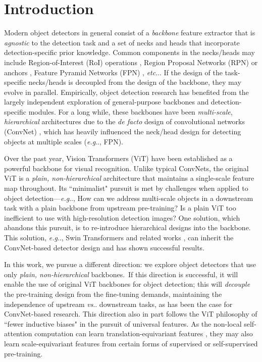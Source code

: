 \documentclass[runningheads]{llncs}
\makeatletter
\DeclareRobustCommand\onedot{\futurelet\@let@token\@onedot}
\def\@onedot{\ifx\@let@token.\else.\null\fi\xspace}
\def\eg{\emph{e.g}\onedot} \def\Eg{\emph{E.g}\onedot}
\def\etc{\emph{etc}\onedot} \def\vs{\emph{vs}\onedot}
\makeatother
\begin{document}
\section{Introduction}

Modern object detectors in general consist of a \textit{backbone} feature extractor that is \textit{agnostic} to the detection task and a set of necks and heads that incorporate detection-specific prior knowledge. Common components in the necks/heads may include Region-of-Interest (RoI) operations \cite{He2014,Girshick2015,He2017}, Region Proposal Networks (RPN) or anchors \cite{Ren2015}, Feature Pyramid Networks (FPN) \cite{Lin2017}, \etc. If the design of the task-specific necks/heads is decoupled from the design of the backbone, they may evolve in parallel. Empirically, object detection research has benefited from the largely independent exploration of general-purpose backbones \cite{Krizhevsky2012,Simonyan2015,Szegedy2015,He2016} and detection-specific modules. For a long while, these backbones have been \textit{multi-scale}, \textit{hierarchical} architectures due to the \textit{de facto} design of convolutional networks (ConvNet) \cite{LeCun1989}, which has heavily influenced the neck/head design for detecting objects at multiple scales (\eg, FPN).

Over the past year, Vision Transformers (ViT) \cite{Dosovitskiy2021} have been established as a powerful backbone for visual recognition. Unlike typical ConvNets, the original ViT is a \textit{plain, non-hierarchical} architecture that maintains a single-scale feature map throughout. 
Its ``minimalist" pursuit is met by challenges when applied to object detection---\eg, How can we address multi-scale objects in a downstream task with a plain backbone from upstream pre-training? Is a plain ViT too inefficient to use with high-resolution detection images? One solution, which abandons this pursuit, is to re-introduce hierarchical designs into the backbone. This solution, \eg, Swin Transformers \cite{Liu2021} and related works \cite{Wang2021,Fan2021,Li2021a,Heo2021}, can inherit the ConvNet-based detector design and has shown successful results.

In this work, we pursue a different direction: we explore object detectors that use only \textit{plain, non-hierarchical} backbones.\footnotemark~If this direction is successful, it will enable the use of original ViT backbones for object detection; this will \textit{decouple} the pre-training design from the fine-tuning demands, maintaining the independence of upstream \vs downstream tasks, as has been the case for ConvNet-based research. This direction also in part follows the ViT philosophy of ``fewer inductive biases" \cite{Dosovitskiy2021} in the pursuit of universal features. 
As the non-local self-attention computation \cite{Vaswani2017} can learn translation-equivariant features \cite{Dosovitskiy2021}, they may also learn scale-equivariant features from certain forms of supervised or self-supervised pre-training.
\end{document}
